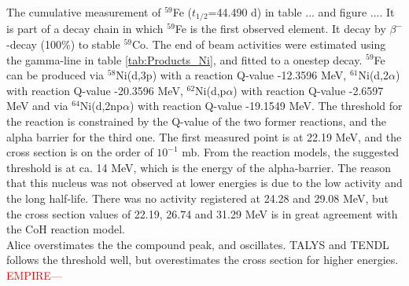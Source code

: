 \subsubsection{}
The cumulative measurement of $^{59}$Fe ($t_{1/2}$=44.490 d) \cite{Basunia2018} in table ... and figure .... It is part of a decay chain in which $^{59}$Fe is the first observed element. It decay by $\beta^-$-decay (100\%) to stable $^{59}$Co. The end of beam activities were estimated using the gamma-line in table \ref{tab:Products_Ni}, and fitted to a onestep decay. $^{59}$Fe can be produced via $^{58}$Ni(d,3p) with a reaction Q-value -12.3596 MeV, $^{61}$Ni(d,2$\alpha$) with reaction Q-value -20.3596 MeV, $^{62}$Ni(d,p$\alpha$) with reaction Q-value  -2.6597 MeV and via $^{64}$Ni(d,2np$\alpha$) with reaction Q-value -19.1549 MeV. The threshold for the reaction is constrained by the Q-value of the two former reactions, and the alpha barrier for the third one. The first measured point is at 22.19 MeV, and the cross section is on the order of $10^{-1}$ mb. From the reaction models, the suggested threshold is at ca. 14 MeV, which is the energy of the alpha-barrier. The reason that this nucleus was not observed at lower energies is due to the low activity and the long half-life. There was no activity registered at 24.28 and 29.08 MeV, but the cross section values of 22.19, 26.74 and 31.29 MeV is in great agreement with the CoH reaction model. \\
\noindent 
Alice overstimates the the compound peak, and oscillates. TALYS and TENDL follows the threshold well, but overestimates the cross section for higher energies. \textcolor{red}{EMPIRE---}

